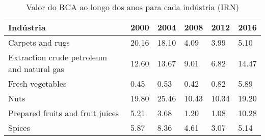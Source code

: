 \begin{table}
\centering
\caption{Valor do RCA ao longo dos anos para cada indústria (IRN)}
\begin{tabular}{p{6cm}p{1.5cm}p{1.5cm}p{1.5cm}p{1.5cm}p{1.5cm}}
\toprule
                                 Indústria &  2000 &  2004 &  2008 &  2012 &  2016 \\
\midrule
                          Carpets and rugs & 20.16 & 18.10 &  4.09 &  3.99 &  5.10 \\
Extraction crude petroleum and natural gas & 12.60 & 13.67 &  9.01 &  6.82 & 14.47 \\
                          Fresh vegetables &  0.45 &  0.53 &  0.42 &  0.82 &  5.89 \\
                                      Nuts & 19.80 & 25.46 & 10.43 & 10.34 & 19.20 \\
          Prepared fruits and fruit juices &  5.21 &  3.68 &  1.20 &  1.08 & 10.28 \\
                                    Spices &  5.87 &  8.36 &  4.61 &  3.07 &  5.14 \\
\bottomrule
\end{tabular}
\end{table}
